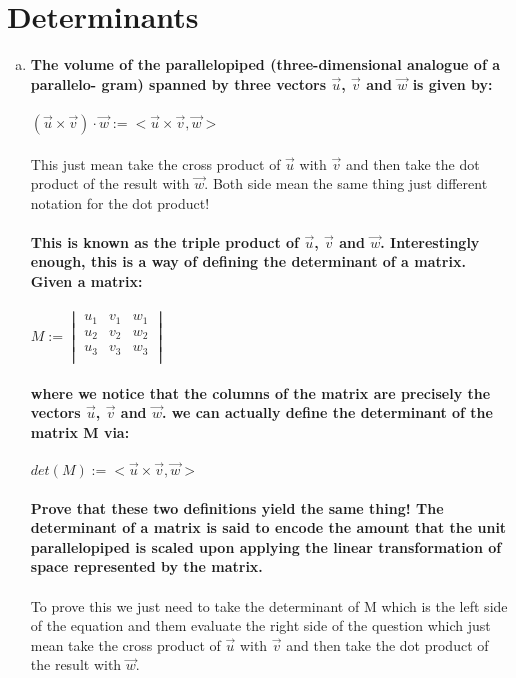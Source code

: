 \documentclass{article}
\begin{document}
\section{Determinants}
\begin{enumerate}[a.]
	\item\textbf{The volume of the parallelopiped (three-dimensional analogue of a parallelo-
	      gram) spanned by three vectors $\vec{u}$, $\vec{v}$ and $\vec{w}$ is given by:}\\
	\\
	$(\vec{u}\times\vec{v})\cdot\vec{w}:=<\vec{u}\times\vec{v},\vec{w}>$\\
	\\ This just mean take the cross product of $\vec{u}$ with $\vec{v}$ and then take the dot product of the result with $\vec{w}$. Both side mean the same thing just different notation for the dot product!\\
	\\
	\textbf{This is known as the triple product of $\vec{u}$, $\vec{v}$ and $\vec{w}$. Interestingly enough, this is a way of defining the determinant of a matrix. Given a matrix:}\\
	\\
	$M:=\begin{vmatrix}
	u_{1}&v_{1}&w_{1}\\
	u_{2}&v_{2}&w_{2}\\
	u_{3}&v_{3}&w_{3}\\
	\end{vmatrix}$\\
	\\
	\textbf{where we notice that the columns of the matrix are precisely the vectors $\vec{u}$, $\vec{v}$ and $\vec{w}$. we can actually define the determinant of the matrix M via:}\\
	\\
	$det(M ) := <\vec{u}\times\vec{v},\vec{w}>$\\
	\\
	\textbf{Prove that these two definitions yield the same thing! The determinant of a
		matrix is said to encode the amount that the unit parallelopiped is scaled upon
		applying the linear transformation of space represented by the matrix.}\\
	\\
	To prove this we just need to take the determinant of M which is the left side of the equation and them evaluate the right side of the question which just mean take the cross product of $\vec{u}$ with $\vec{v}$ and then take the dot product of the result with $\vec{w}$.\\

\end{enumerate}
\end{document}
